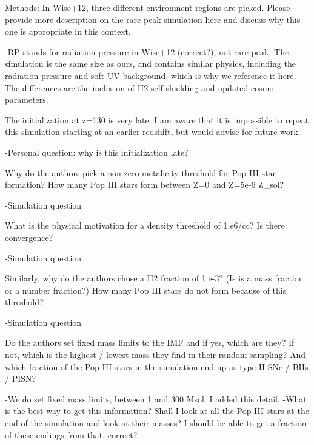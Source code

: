 \documentclass[11pt]{article}
\begin{document}
\begin{referee}
Methods:
In Wise+12, three different environment regions are picked. Please provide more 
description on the rare peak simulation here and discuss why this one is 
appropriate in this context.
\end{referee}
-RP stands for radiation pressure in Wise+12 (correct?), not rare peak. The simulation is the same size as ours, and contains similar physics, including the radiation pressure and soft UV background, which is why we reference it here. The differences are the inclusion of H2 self-shielding and updated cosmo parameters.

\begin{referee}
The initialization at z=130 is very late. I am aware that it is impossible to 
repeat this simulation starting at an earlier redshift, but would advise for 
future work.
\end{referee}
-Personal question: why is this initialization late?

\begin{referee}
Why do the authors pick a non-zero metalicity threshold for Pop III star 
formation? How many Pop III stars form between Z=0 and Z=5e-6 Z_sol?
\end{referee}
-Simulation question


\begin{referee}
What is the physical motivation for a density threshold of 1.e6/cc? Is there 
convergence? 
\end{referee}
-Simulation question

\begin{referee}
Similarly, why do the authors chose a H2 fraction of 1.e-3? (Is is a mass 
fraction or a number fraction?) How many Pop III stars do not form because of 
this threshold?
\end{referee}
-Simulation question

\begin{referee}
Do the authors set fixed mass limits to the IMF and if yes, which are they? 
If not, which is the highest / lowest mass they find in their random sampling? 
And which fraction of the Pop III stars in the simulation end up as type II 
SNe / BHs / PISN?
\end{referee}
-We do set fixed mass limits, between 1 and 300 Msol. I added this detail. 
-What is the best way to get this information? Shall I look at all the Pop III stars at the end of the simulation and look at their masses? I should be able to get a fraction of these endings from that, correct?
\end{document}
